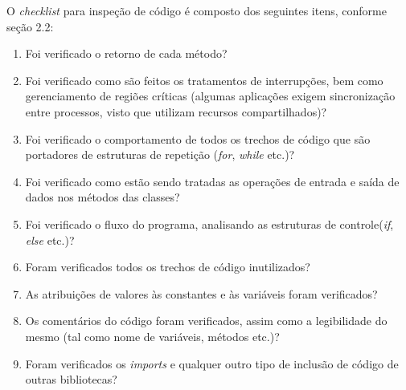 O \textit{checklist} para inspeção de código é composto dos seguintes itens, conforme seção 2.2:

\begin{enumerate}
	\item Foi verificado o retorno de cada método?
	\item Foi verificado como são feitos os tratamentos de interrupções, bem como gerenciamento de regiões críticas (algumas aplicações exigem sincronização entre processos, visto que utilizam recursos compartilhados)?
	\item Foi verificado o comportamento de todos os trechos de código que são portadores de estruturas de repetição (\textit{for}, \textit{while} etc.)?
	\item Foi verificado como estão sendo tratadas as operações de entrada e saída de dados nos métodos das classes?
	\item Foi verificado o fluxo do programa, analisando as estruturas de controle(\textit{if}, \textit{else} etc.)?
	\item Foram verificados todos os trechos de código inutilizados?
	\item As atribuições de valores às constantes e às variáveis foram verificados?
	\item Os comentários do código foram verificados, assim como a legibilidade do mesmo (tal como nome de variáveis, métodos etc.)?
	\item Foram verificados os \textit{imports} e qualquer outro tipo de inclusão de código de outras bibliotecas?
\end{enumerate}
